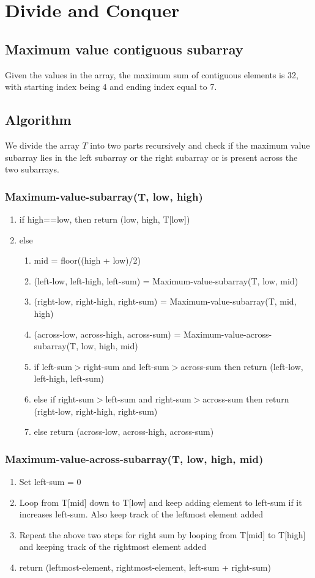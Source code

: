 \documentclass[10pt,a4paper]{article}
\begin{document}
\section{Divide and Conquer}
\subsection{Maximum value contiguous subarray}
Given the values in the array, the maximum sum of contiguous elements is 32, with starting index being 4 and ending index equal to 7.
\subsection{Algorithm}
We divide the array $T$ into two parts recursively and check if the maximum value subarray lies in the left subarray or the right subarray or is present across the two subarrays.
\subsubsection*{Maximum-value-subarray(T, low, high)}
\begin{enumerate}
\item if high==low, then return (low, high, T[low])
\item else
\begin{enumerate}
\item mid = floor((high + low)/2)
\item (left-low, left-high, left-sum) = Maximum-value-subarray(T, low, mid)
\item (right-low, right-high, right-sum) = Maximum-value-subarray(T, mid, high)
\item (across-low, across-high, across-sum) = Maximum-value-across-subarray(T, low, high, mid)
\item if left-sum$>$right-sum and left-sum$>$across-sum then return (left-low, left-high, left-sum)
\item else if right-sum$>$left-sum and right-sum$>$across-sum then return (right-low, right-high, right-sum)
\item else return (across-low, across-high, across-sum)
\end{enumerate}
\end{enumerate}
\subsubsection*{Maximum-value-across-subarray(T, low, high, mid)}
\begin{enumerate}
\item Set left-sum = 0
\item Loop from T[mid] down to T[low] and keep adding element to left-sum if it increases left-sum. Also keep track of the leftmost element added
\item Repeat the above two steps for right sum by looping from T[mid] to T[high] and keeping track of the rightmost element added
\item return (leftmost-element, rightmost-element, left-sum + right-sum)
\end{enumerate}
\end{document}
